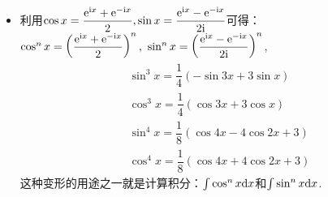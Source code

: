 \begin{itemize}[leftmargin=\inteval{\myitemleftmargin}pt,itemsep=
   \inteval{\myitemitempsep}pt,topsep=\inteval{\myitemtopsep}pt]
\item 利用$ \cos x=\dfrac{\mathrm{e}^{\mathrm{i} x}+\mathrm{e}^{-\mathrm{i} x}}{2},
\sin x=\dfrac{\mathrm{e}^{\mathrm{i} x}-\mathrm{e}^{-\mathrm{i} x}}{2\mathrm{i}} $可得：$
\cos^n x=\left( \dfrac{\e^{\i x}+\e^{-\i x}}{2}\right)^n,\ 
\sin^n x=\left(\dfrac{\e^{\i x}-\e^{-\i x}}{2\i}\right)^n $,
\begin{align*}
    &  \sin^3 x=\dfrac{1}{4}(-\sin3x+3\sin x)  \\
    &  \cos^3 x=\dfrac{1}{4}( \cos3x+3\cos x)	\\
    &  \sin^4 x=\dfrac{1}{8}(\cos 4x-4\cos 2x+3)  \\
    &  \cos^4 x=\dfrac{1}{8}(\cos 4x+4\cos 2x+3) 
\end{align*}
这种变形的用途之一就是计算积分：$ \int \cos^n x \mathrm{d} x $和$ \int \sin^n x \mathrm{d} x $. 

\end{itemize}


